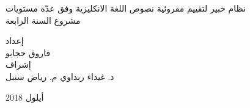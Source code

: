 	
	\vspace{2cm}
	\begin{center}
		{
			\Huge


			نظام خبير لتقييم مقروئية نصوص اللغة الانكليزية وفق عدّة مستويات
			\\[2.5mm]
			\Large
			مشروع السنة الرابعة
		}
	
		\vspace{3cm}
		\begin{doublespace}
			إعداد \\
			{
				\authorsfont
				فاروق حجابو \\[7mm]
			}
			إشراف \\[3mm]
			{
				\authorsfont
				د. غيداء ربداوي
				\hspace{2.5cm}
				م. رياض سنبل
			}
		\end{doublespace}
	\end{center}
		
	\vfill
	\centerline{أيلول 2018}
	


